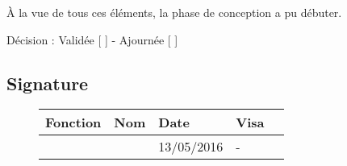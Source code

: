 \documentclass[asi, sansVersion]{picInsa}
\begin{document}
À la vue de tous ces éléments, la phase de conception a pu débuter.

\begin{center}
Décision : Validée [ \checkmark{} ] - Ajournée [ ]
\end{center}

\subsection*{Signature}
\begin{figure}[H]
		\centering
		\begin{tabularx}{17cm}{|p{4cm}|X|X|X|X|}
		\hline
		\rowcolor[gray]{0.85} Fonction & Nom & Date & Visa \\
		\hline
		\CP{} & \Sergi{} & 13/05/2016 & - \\
		\hline
		\end{tabularx}
\end{figure}
\end{document}
